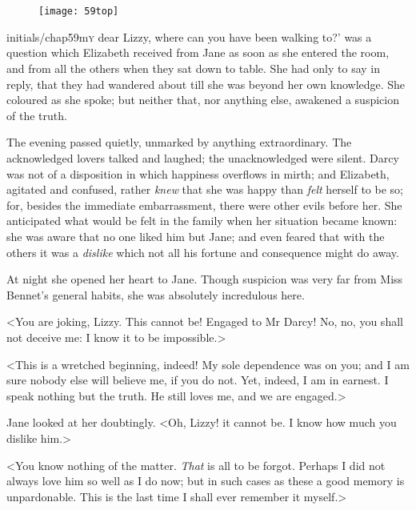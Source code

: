 \chapter[Chapter \thechapter]{}
	

\begin{figure}[t!]
\centering
\texttt{[image: 59top]}
\end{figure}


\lettrine[lines=6,image=true,ante=`]{initials/chap59m}{y} dear Lizzy, where can you have been walking to?' was a question which Elizabeth received from Jane as soon as she entered the room, and from all the others when they sat down to table. She had only to say in reply, that they had wandered about till she was beyond her own knowledge. She coloured as she spoke; but neither that, nor anything else, awakened a suspicion of the truth.

The evening passed quietly, unmarked by anything extraordinary. The acknowledged lovers talked and laughed; the unacknowledged were silent. Darcy was not of a disposition in which happiness overflows in mirth; and Elizabeth, agitated and confused, rather \textit{knew} that she was happy than \textit{felt} herself to be so; for, besides the immediate embarrassment, there were other evils before her. She anticipated what would be felt in the family when her situation became known: she was aware that no one liked him but Jane; and even feared that with the others it was a \textit{dislike} which not all his fortune and consequence might do away.

At night she opened her heart to Jane. Though suspicion was very far from Miss Bennet's general habits, she was absolutely incredulous here.

<You are joking, Lizzy. This cannot be! Engaged to Mr Darcy! No, no, you shall not deceive me: I know it to be impossible.>

<This is a wretched beginning, indeed! My sole dependence was on you; and I am sure nobody else will believe me, if you do not. Yet, indeed, I am in earnest. I speak nothing but the truth. He still loves me, and we are engaged.>

Jane looked at her doubtingly. <Oh, Lizzy! it cannot be. I know how much you dislike him.>

<You know nothing of the matter. \textit{That} is all to be forgot. Perhaps I did not always love him so well as I do now; but in such cases as these a good memory is unpardonable. This is the last time I shall ever remember it myself.>

